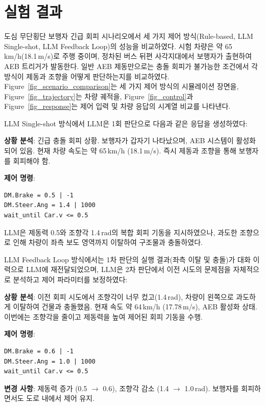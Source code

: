 \documentclass[final,5p,times,twocolumn,9pt]{elsarticle}
\begin{document}
\section{실험 결과}
\label{sec:results}

도심 무단횡단 보행자 긴급 회피 시나리오에서 세 가지 제어 방식(Rule-based, LLM Single-shot, LLM Feedback Loop)의 성능을 비교하였다. 시험 차량은 약 65\,km/h(18.1\,m/s)로 주행 중이며, 정차된 버스 뒤편 사각지대에서 보행자가 출현하여 AEB 트리거가 발동한다. 일반 AEB 제동만으로는 충돌 회피가 불가능한 조건에서 각 방식이 제동과 조향을 어떻게 판단하는지를 비교하였다. Figure~\ref{fig_scenario_comparison}는 세 가지 제어 방식의 시뮬레이션 장면을, Figure~\ref{fig_trajectory}는 차량 궤적을, Figure~\ref{fig_control}과 Figure~\ref{fig_response}는 제어 입력 및 차량 응답의 시계열 비교를 나타낸다.

LLM Single-shot 방식에서 LLM은 1회 판단으로 다음과 같은 응답을 생성하였다:

\begin{llmbox}
\textbf{상황 분석}: 긴급 충돌 회피 상황. 보행자가 갑자기 나타났으며, AEB 시스템이 활성화되어 있음. 현재 차량 속도는 약 65\,km/h (18.1\,m/s). 즉시 제동과 조향을 통해 보행자를 회피해야 함.

\textbf{제어 명령}:
\begin{lstlisting}
DM.Brake = 0.5 | -1
DM.Steer.Ang = 1.4 | 1000
wait_until Car.v <= 0.5
\end{lstlisting}
\end{llmbox}

\noindent LLM은 제동력 0.5와 조향각 1.4\,rad의 복합 회피 기동을 지시하였으나, 과도한 조향으로 인해 차량이 좌측 보도 영역까지 이탈하여 구조물과 충돌하였다.

LLM Feedback Loop 방식에서는 1차 판단의 실행 결과(좌측 이탈 및 충돌)가 대화 이력으로 LLM에 재전달되었으며, LLM은 2차 판단에서 이전 시도의 문제점을 자체적으로 분석하고 제어 파라미터를 보정하였다:

\begin{llmbox}
\textbf{상황 분석}: 이전 회피 시도에서 조향각이 너무 컸고(1.4\,rad), 차량이 왼쪽으로 과도하게 이탈하여 건물과 충돌했음. 현재 속도 약 64\,km/h (17.78\,m/s), AEB 활성화 상태. 이번에는 조향각을 줄이고 제동력을 높여 제어된 회피 기동을 수행.

\textbf{제어 명령}:
\begin{lstlisting}
DM.Brake = 0.6 | -1
DM.Steer.Ang = 1.0 | 1000
wait_until Car.v <= 0.5
\end{lstlisting}

\textbf{변경 사항}: 제동력 증가 (0.5 $\rightarrow$ 0.6), 조향각 감소 (1.4 $\rightarrow$ 1.0\,rad). 보행자를 회피하면서도 도로 내에서 제어 유지.
\end{llmbox}
\end{document}
